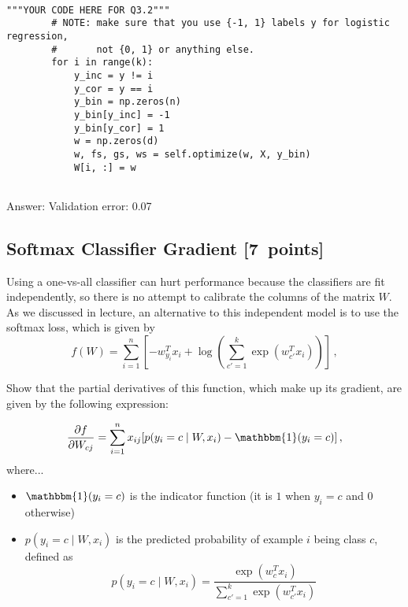 \documentclass{article}
\newcommand{\blu}[1]{{\textcolor{blu}{#1}}}
\newenvironment{answer}{\par\begingroup\color{gre}Answer: }{\endgroup}
\let\ask\blu
\newcommand\pts[1]{\textcolor{pointscolour}{[#1~points]}}
\begin{document}
\begin{verbatim}

"""YOUR CODE HERE FOR Q3.2"""
        # NOTE: make sure that you use {-1, 1} labels y for logistic regression,
        #       not {0, 1} or anything else.
        for i in range(k):
            y_inc = y != i
            y_cor = y == i
            y_bin = np.zeros(n)
            y_bin[y_inc] = -1
            y_bin[y_cor] = 1
            w = np.zeros(d) 
            w, fs, gs, ws = self.optimize(w, X, y_bin)
            W[i, :] = w
    
\end{verbatim}

\begin{answer}
    Validation error: 0.07
\end{answer}

\subsection{Softmax Classifier Gradient \pts{7}}

Using a one-vs-all classifier can hurt performance because the classifiers are fit independently, so there is no attempt to calibrate the columns of the matrix $W$. As we discussed in lecture, an alternative to this independent model is to use the softmax loss, which is given by
\[
f(W) = \sum_{i=1}^n \left[-w_{y_i}^Tx_i + \log\left(\sum_{c' = 1}^k \exp(w_{c'}^Tx_i)\right)\right] \, ,
\]

\ask{Show that the partial derivatives of this function, which make up its gradient, are given by the following expression:}

\[
\frac{\partial f}{\partial W_{cj}} = \sum_{i=1}^n x_{ij}[p(y_i=c \mid W,x_i) - \mathbbm{1}(y_i = c)] \, ,
\]
where...
\begin{itemize}
\item $\mathbbm{1}(y_i = c)$ is the indicator function (it is $1$ when $y_i=c$ and $0$ otherwise)
\item $p(y_i=c \mid W, x_i)$ is the predicted probability of example $i$ being class $c$, defined as
\[
p(y_i=c \mid W, x_i) = \frac{\exp(w_c^Tx_i)}{\sum_{c'=1}^k\exp(w_{c'}^Tx_i)}
\]


\end{itemize}
\end{document}
